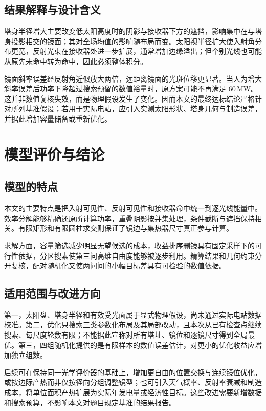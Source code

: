 \documentclass[UTF8,a4paper,zihao=-4,fontset=mac]{ctexart}
\begin{document}


\subsection{结果解释与设计含义}
塔身半径增大主要改变低太阳高度时的阴影与接收器下方的遮挡，影响集中在与塔身投影相交的镜面；其对全场均值的影响随布局而变。太阳视半径扩大使入射角分布更宽，反射光束在接收器处进一步扩展，通常增加边缘溢出；但个别光线也可能从原先未命中转为命中，因此必须整体积分。

镜面斜率误差经反射角近似放大两倍，远距离镜面的光斑位移更显著。当人为增大斜率误差后功率下降超过搜索预留的数值裕量时，原方案可能不再满足 $60\,\mathrm{MW}$。这并非数值复核失效，而是物理假设发生了变化。因而本文的最终达标结论严格针对所列基准假设；若用于实际电站，应引入实测太阳形状、塔身几何与制造误差，并据此增加容量储备或重新优化。

\section{模型评价与结论}
\subsection{模型的特点}
本文的主要特点是把入射可见性、反射可见性和接收器命中统一到逐光线能量中。效率分解能够精确还原所计算功率，重叠阴影按并集处理，条件截断与遮挡保持相关。有限矩形和有限圆柱求交则保证了镜边与集热器尺寸真正参与计算。

求解方面，容量筛选减少明显无望候选的成本，收益排序删镜具有固定采样下的可行性依据，分区搜索使第三问高维自由度能够被逐步利用。精算结果和几何约束分开复核，配对随机化又使两问间的小幅目标差具有可检验的数值依据。

\subsection{适用范围与改进方向}
第一，太阳盘、塔身半径和有效受光面属于显式物理假设，尚未通过实际电站数据校准。第二，优化只搜索三类参数化布局及其局部改动，且本次从已有检查点继续搜索、每尺度轮数有限；不能据此宣称对所有塔址、镜位和逐镜尺寸得到全局最优。第三，四组随机化提供的是有限样本的数值误差估计，对更小的优化收益应增加独立组数。

后续可在保持同一光学评价器的基础上，增加更自由的位置交换与连续镜位优化，或按边际产热而非仅按径向分组调整镜型；也可引入天气概率、反射率衰减和制造成本，将单位面积产热扩展为实际年发电量或经济性目标。这些改进需要新增数据和搜索预算，不影响本文对题目规定基准的结果报告。
\end{document}

